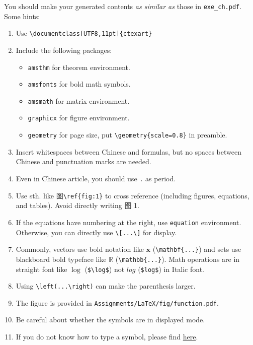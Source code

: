 \documentclass[english]{../TexTemplate/thesis}
\begin{document}
You should make your generated contents \emph{as similar as} those in \verb'exe_ch.pdf'.
Some hints:
\begin{enumerate}
	\item Use \verb'\documentclass[UTF8,11pt]{ctexart}'
	\item Include the following packages:
	\begin{itemize}
		\item \verb'amsthm' for theorem environment.
		\item \verb'amsfonts' for bold math symbols.
		\item \verb'amsmath' for matrix environment.
		\item \verb'graphicx' for figure environment.
		\item \verb'geometry' for page size, put \verb'\geometry{scale=0.8}' in preamble.
	\end{itemize}
	\item Insert whitespaces between Chinese and formulas, but no spaces between Chinese and punctuation marks are needed.
	\item Even in Chinese article, you should use \verb'.' as period.
	\item Use sth. like 图\verb'\ref{fig:1}' to cross reference (including figures, equations, and tables). Avoid directly writing 图 1.
	\item If the equations have numbering at the right, use \verb'equation' environment.
	Otherwise, you can directly use \verb'\[...\]' for display.
	\item Commonly, vectors use bold notation like $\mathbf{x}$ (\verb'\mathbf{...}') and sets use blackboard bold typeface like $\mathbb{R}$ (\verb'\mathbb{...}'). Math operations are in straight font like $\log$ (\verb'$\log$') not $log$ (\verb'$log$') in Italic font.
	\item Using \verb'\left(...\right)' can make the parenthesis larger.
	\item The figure is provided in \verb'Assignments/LaTeX/fig/function.pdf'.
	\item Be careful about whether the symbols are in displayed mode.
	\item If you do not know how to type a symbol, please find \href{https://katex.org/docs/supported.html}{here}.
\end{enumerate}
\end{document}
